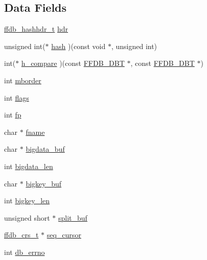 \subsection*{Data Fields}
\begin{DoxyCompactItemize}
\item 
\mbox{\hyperlink{ffdb__hash_8h_aab0f28f6f6872895710d2edc192c8d3a}{ffdb\+\_\+hashhdr\+\_\+t}} \mbox{\hyperlink{structhtab_ace908dbb78be497aeb76124ebf0e26b5}{hdr}}
\item 
unsigned int($\ast$ \mbox{\hyperlink{structhtab_a6b0a7315a164a7a3a874b9784c26f865}{hash}} )(const void $\ast$, unsigned int)
\item 
int($\ast$ \mbox{\hyperlink{structhtab_ad5b9916241401de56f7374b6d846d1ac}{h\+\_\+compare}} )(const \mbox{\hyperlink{other__libs_2filedb_2filehash_2ffdb__db_8h_aa2e0984399491df0fdd20898ca8758f9}{F\+F\+D\+B\+\_\+\+D\+BT}} $\ast$, const \mbox{\hyperlink{other__libs_2filedb_2filehash_2ffdb__db_8h_aa2e0984399491df0fdd20898ca8758f9}{F\+F\+D\+B\+\_\+\+D\+BT}} $\ast$)
\item 
int \mbox{\hyperlink{structhtab_a3d3e7570e07708a89d0e835609310464}{mborder}}
\item 
int \mbox{\hyperlink{structhtab_aec553f223cf81af78090be98b9e4a132}{flags}}
\item 
int \mbox{\hyperlink{structhtab_a3d34e277d5fe6638f28fd17f0627ce10}{fp}}
\item 
char $\ast$ \mbox{\hyperlink{structhtab_ab9eb75d5c77176a801994a26ea432713}{fname}}
\item 
char $\ast$ \mbox{\hyperlink{structhtab_ae1cdd71f91fd6dcfa3b17f1f2e293d59}{bigdata\+\_\+buf}}
\item 
int \mbox{\hyperlink{structhtab_a6c9a0fed7b96ac07dbe0d82a9cfdeb29}{bigdata\+\_\+len}}
\item 
char $\ast$ \mbox{\hyperlink{structhtab_ab1370f3af599a408c29fdf26a8db4f05}{bigkey\+\_\+buf}}
\item 
int \mbox{\hyperlink{structhtab_a13d0d4e3ecdde7a7b11a846396255cd0}{bigkey\+\_\+len}}
\item 
unsigned short $\ast$ \mbox{\hyperlink{structhtab_acf1c05487c78d14d6897d1d51d5ba704}{split\+\_\+buf}}
\item 
\mbox{\hyperlink{ffdb__hash_8h_a103d84beefb6d7306cb252c4d7f25479}{ffdb\+\_\+crs\+\_\+t}} $\ast$ \mbox{\hyperlink{structhtab_a7ed0276958f6e0e778ea4398c53aef40}{seq\+\_\+cursor}}
\item 
int \mbox{\hyperlink{structhtab_a27cb940c79df2d115593e71ab05a0643}{db\+\_\+errno}}
\item 

\end{DoxyCompactItemize}
